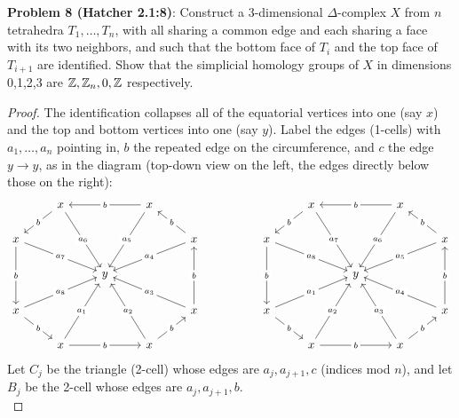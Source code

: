 \documentclass{amsart}
\begin{document}
\newpage
\textbf{Problem 8 (Hatcher 2.1:8)}: Construct a 3-dimensional $\Delta$-complex $X$ from $n$ tetrahedra $T_1,\dots,T_n$, with all sharing a common edge and each sharing a face with its two neighbors, and such that the bottom face of $T_i$ and the top face of $T_{i+1}$ are identified. Show that the simplicial homology groups of $X$ in dimensions 0,1,2,3 are $\mathbb{Z},\mathbb{Z}_n,0,\mathbb{Z}$ respectively.
\begin{proof}
	The identification collapses all of the equatorial vertices into one (say $x$) and the top and bottom vertices into one (say $y$). Label the edges (1-cells) with $a_1,\dots,a_n$ pointing in, $b$ the repeated edge on the circumference, and $c$ the edge $y\to y$, as in the diagram (top-down view on the left, the edges directly below those on the right):
	$$
	\begin{tikzcd}
		& x && x &&&& x && x \\
		x &&&& x && x &&&& x \\
		&& y &&&&&& y \\
		x &&&& x && x &&&& x \\
		& x && x &&&& x && x
		\arrow["b"{description}, from=1-2, to=2-1]
		\arrow["{a_6}"{description}, from=1-2, to=3-3]
		\arrow["b"{description}, from=1-4, to=1-2]
		\arrow["{a_5}"{description}, from=1-4, to=3-3]
		\arrow["b"{description}, from=1-8, to=2-7]
		\arrow["{a_7}"{description}, from=1-8, to=3-9]
		\arrow["b"{description}, from=1-10, to=1-8]
		\arrow["{a_6}"{description}, from=1-10, to=3-9]
		\arrow["{a_7}"{description}, from=2-1, to=3-3]
		\arrow["b"{description}, from=2-1, to=4-1]
		\arrow["b"{description}, from=2-5, to=1-4]
		\arrow["{a_4}"{description}, from=2-5, to=3-3]
		\arrow["{a_8}"{description}, from=2-7, to=3-9]
		\arrow["b"{description}, from=2-7, to=4-7]
		\arrow["b"{description}, from=2-11, to=1-10]
		\arrow["{a_5}"{description}, from=2-11, to=3-9]
		\arrow["{a_8}"{description}, from=4-1, to=3-3]
		\arrow["b"{description}, from=4-1, to=5-2]
		\arrow["b"{description}, from=4-5, to=2-5]
		\arrow["{a_3}"{description}, from=4-5, to=3-3]
		\arrow["{a_1}"{description}, from=4-7, to=3-9]
		\arrow["b"{description}, from=4-7, to=5-8]
		\arrow["b"{description}, from=4-11, to=2-11]
		\arrow["{a_4}"{description}, from=4-11, to=3-9]
		\arrow["{a_1}"{description}, from=5-2, to=3-3]
		\arrow["b"{description}, from=5-2, to=5-4]
		\arrow["{a_2}"{description}, from=5-4, to=3-3]
		\arrow["b"{description}, from=5-4, to=4-5]
		\arrow["{a_2}"{description}, from=5-8, to=3-9]
		\arrow["b"{description}, from=5-8, to=5-10]
		\arrow["{a_3}"{description}, from=5-10, to=3-9]
		\arrow["b"{description}, from=5-10, to=4-11]
	\end{tikzcd}
	$$
	Let $C_j$ be the triangle (2-cell) whose edges are $a_j,a_{j+1},c$ (indices mod $n$), and let $B_j$ be the 2-cell whose edges are $a_j,a_{j+1},b$.\\
	

\end{proof}
\end{document}
